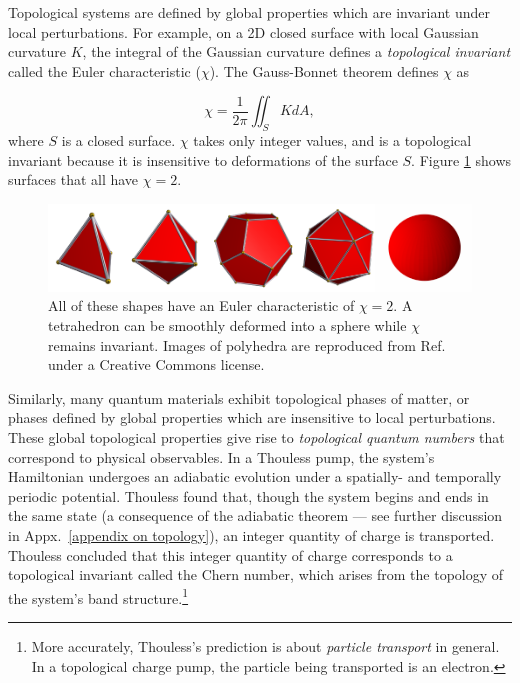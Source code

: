 \documentclass[double,12pt,1in,seploa]{beavtex}
\begin{document}
Topological systems are defined by global properties which are invariant under local perturbations. For example, on a 2D closed surface with local Gaussian curvature $K$, the integral of the Gaussian curvature defines a \textit{topological invariant} called the Euler characteristic ($\chi$). The Gauss-Bonnet theorem defines $\chi$ as

\begin{equation}
    \chi = \frac{1}{2\pi}\iint_S K dA,
\end{equation}
where $S$ is a closed surface. $\chi$ takes only integer values, and is a topological invariant because it is insensitive to deformations of the surface $S$. Figure \ref{surfaces} shows surfaces that all have $\chi = 2$.

\begin{figure}
    \includegraphics{shapes intro fig.pdf}
    \caption{All of these shapes have an Euler characteristic of $\chi = 2$. A tetrahedron can be smoothly deformed into a sphere while $\chi$ remains invariant. Images of polyhedra are reproduced from Ref.\ \cite{webb_stella_nodate} under a Creative Commons license.}
    \label{surfaces}
\end{figure}

Similarly, many quantum materials exhibit topological phases of matter, or phases defined by global properties which are insensitive to local perturbations. These global topological properties give rise to \textit{topological quantum numbers} that correspond to physical observables. In a Thouless pump, the system's Hamiltonian undergoes an adiabatic evolution under a spatially- and temporally periodic potential. Thouless found that, though the system begins and ends in the same state (a consequence of the adiabatic theorem — see further discussion in Appx.\ \ref{appendix on topology}), an integer quantity of charge is transported. Thouless concluded that this integer quantity of charge corresponds to a topological invariant called the Chern number, which arises from the topology of the system's band structure.\footnote{More accurately, Thouless's prediction is about \textit{particle transport} in general. In a topological charge pump, the particle being transported is an electron.}
\end{document}
